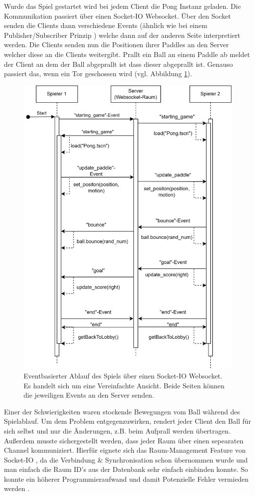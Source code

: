 \documentclass[
]{article}
\begin{document}
Wurde das Spiel gestartet wird bei jedem Client die Pong Instanz geladen. Die Kommunikation passiert über einen Socket-IO Websocket. Über den Socket senden die Clients dann verschiedene Events (ähnlich wie bei einem Publisher/Subscriber Prinzip \cite{tanenbaum2007distributed}) welche dann auf der anderen Seite interpretiert werden. Die Clients senden nun die Positionen ihrer Paddles an den Server welcher diese an die Clients weitergibt. Prallt ein Ball an einem Paddle ab meldet der Client an dem der Ball abgeprallt ist dass dieser abgeprallt ist. Genauso passiert das, wenn ein Tor geschossen wird (vgl. Abbildung \ref{fig:ablaufdiagramm-spiel}). 
\begin{figure}[H]
	\centering
	\includegraphics[width=\textwidth -120pt ]{resources/Event-Based-Spielablauf.png}
	\caption{Eventbasierter Ablauf des Spiels über einen Socket-IO Websocket. Es handelt sich um eine Vereinfachte Ansicht. Beide Seiten können die jeweiligen Events an den Server senden.}
	\label{fig:ablaufdiagramm-spiel}
\end{figure}
Einer der Schwierigkeiten waren stockende Bewegungen vom Ball während des Spielablauf. Um dem Problem entgegenzuwirken, rendert jeder Client den Ball für sich selbst und nur die Änderungen, z.B. beim Aufprall werden übertragen. 
Außerdem musste sichergestellt werden, dass jeder Raum über einen sepearaten Channel kommuniziert. Hierfür eignete sich das Raum-Management Feature von Socket-IO , da die Verbindung \& Synchronisation schon übernommen wurde und man einfach die Raum ID's aus der Datenbank sehr einfach einbinden konnte. So konnte ein höherer Programmieraufwand und damit Potenzielle Fehler vermieden werden \cite{SocketIORooms}. 
\end{document}

